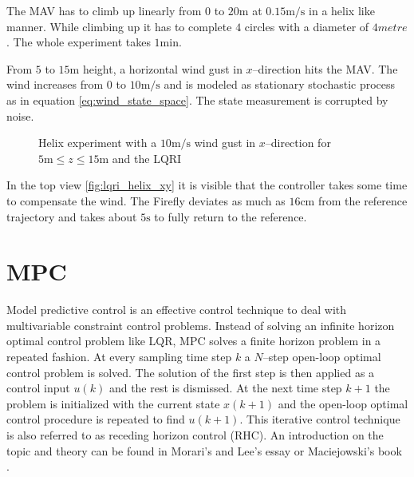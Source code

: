 The MAV has to climb up linearly from $0$ to $20 \si{\metre}$ at $0.15 \si{\metre\per\second}$ in a helix like manner. While climbing up it has to complete $4$ circles with a diameter of $4\si{metre}$. The whole experiment takes $1 \si{\minute}$. 

From $5$ to $15 \si{\metre}$ height, a horizontal wind gust in $x$--direction hits the MAV. The wind increases from $0$ to $10 \si{\metre\per\second}$ and is modeled as stationary stochastic process as in equation \ref{eq:wind_state_space}. The state measurement is corrupted by noise.

\begin{figure}
\centering
{}
\qquad
{}
\caption{Helix experiment with a $10 \si{\metre\per\second}$ wind gust in $x$--direction for $5 \si{\metre} \leq z \leq 15 \si{\metre}$ and the LQRI}
\label{fig:lqri_helix}
\end{figure}

In the top view \ref{fig:lqri_helix_xy} it is visible that the controller takes some time to compensate the wind. The Firefly deviates as much as $16 \si{\centi\metre}$ from the reference trajectory and takes about $5 \si{\second}$ to fully return to the reference.
\section{MPC} 
Model predictive control is an effective control technique to deal with multivariable constraint control problems. Instead of solving an infinite horizon optimal control problem like LQR, MPC solves a finite horizon problem in a repeated fashion. At every sampling time step $k$ a $N$--step open-loop optimal control problem is solved. The solution of the first step is then applied as a control input $u(k)$ and the rest is dismissed. At the next time step $k+1$ the problem is initialized with the current state $x(k+1)$ and the open-loop optimal control procedure is repeated to find $u(k+1)$. This iterative control technique is also referred to as receding horizon control (RHC). An introduction on the topic and theory can be found in Morari's and Lee's essay \cite{Morari1999} or Maciejowski's book \cite{Maciejowski2002}.

